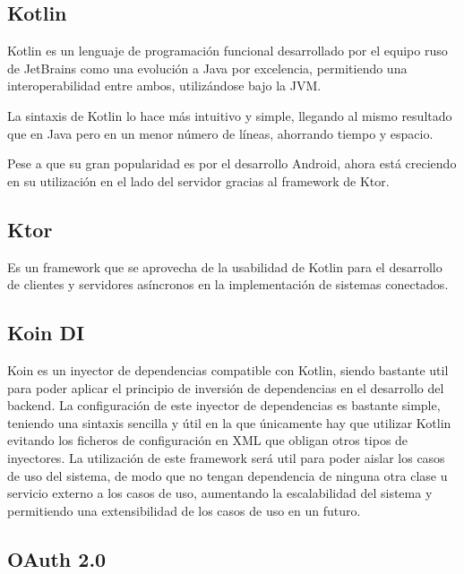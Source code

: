     \subsection{Kotlin}

Kotlin es un lenguaje de programación funcional desarrollado por el equipo ruso de JetBrains como una evolución a Java por excelencia, permitiendo una interoperabilidad entre ambos, utilizándose bajo la JVM.

La sintaxis de Kotlin lo hace más intuitivo y simple, llegando al mismo resultado que en Java pero en un menor número de líneas, ahorrando tiempo y espacio.

Pese a que su gran popularidad es por el desarrollo Android, ahora está creciendo en su utilización en el lado del servidor gracias al framework de Ktor. 

    \subsection{Ktor}

Es un framework que se aprovecha de la usabilidad de Kotlin para el desarrollo de clientes y servidores asíncronos en la implementación de sistemas conectados.

    \subsection{Koin DI}

Koin es un inyector de dependencias compatible con Kotlin, siendo bastante util para poder aplicar el principio de inversión de dependencias en el desarrollo del backend. 
La configuración de este inyector de dependencias es bastante simple, teniendo una sintaxis sencilla y útil en la que únicamente hay que utilizar Kotlin evitando los ficheros de configuración en XML que obligan otros tipos de inyectores.
La utilización de este framework será util para poder aislar los casos de uso del sistema, de modo que no tengan dependencia de ninguna otra clase u servicio externo a los casos de uso, aumentando la escalabilidad del sistema y permitiendo una extensibilidad de los casos de uso en un futuro.

    \subsection{OAuth 2.0}
    
